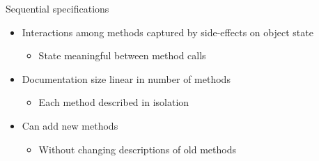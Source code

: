 \begin{frame}{Sequential specifications}

\begin{itemize}
  \item Interactions among methods captured by side-effects on object state
  \begin{itemize}
    \item State meaningful between method calls    
  \end{itemize}

  \item Documentation size linear in number of methods
  \begin{itemize}
    \item Each method described in isolation
  \end{itemize}

  \item Can add new methods
  \begin{itemize}
    \item Without changing descriptions of old methods
  \end{itemize}
\end{itemize}

\end{frame}


